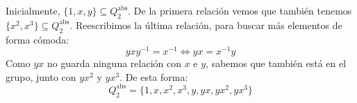 \begin{ejemplo}
\begin{enumerate}
            Inicialmente, $\{1,x,y\}\subseteq Q^{\text{abs}}_2$. De la primera relación vemos que también tenemos $\{x^2,x^3\}\subseteq Q^{\text{abs}}_2$. Reescribimos la última relación, para buscar más elementos de forma cómoda:
            \begin{equation*}
                yxy^{-1} = x^{-1} \Longleftrightarrow yx = x^{-1}y
            \end{equation*}
            Como $yx$ no guarda ninguna relación con $x$ e $y$, sabemos que también está en el grupo, junto con $yx^2$ y $yx^3$. De esta forma:
            \begin{equation*}
                Q^{\text{abs}}_2 = \{1,x,x^2,x^3,y,yx,yx^2,yx^3\}
            \end{equation*}
    \end{enumerate}
\end{ejemplo}

